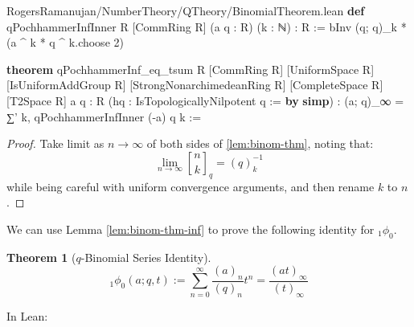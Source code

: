\documentclass[12pt]{amsart}
\newtheorem{theorem}{Theorem}[subsection]
\theoremstyle{definition}
\theoremstyle{remark}
\numberwithin{equation}{subsection}
\newcommand{\qbin}[2]{\genfrac{[}{]}{0pt}{}{#1}{#2}_{q}}
\newcommand{\kw}[1]{\textcolor{keywordcolor}{\textbf{#1}}}
\newcommand{\var}[1]{\textcolor{tacticcolor}{#1}}
\newcommand{\prop}[1]{\textcolor{sortcolor}{#1}}
\newcommand{\num}[1]{\textcolor{numcolor}{#1}}
\newcommand{\imp}[1]{\textcolor{commentcolor}{\textbraceleft#1\textbraceright}}
\begin{document}
\begin{code}{RogersRamanujan/NumberTheory/QTheory/BinomialTheorem.lean}
\kw{def} qPochhammerInfInner \imp{R} [CommRing \var{R}] (\var{a} \var{q} : \var{R}) (\var{k} : ℕ) : \var{R} :=
  bInv (\var{q}; \var{q})_\var{k} * (\var{a} ^ \var{k} * \var{q} ^ \var{k}.\prop{choose} \num{2})

\kw{theorem} qPochhammerInf_eq_tsum \imp{R} [CommRing \var{R}] [UniformSpace \var{R}]
  [IsUniformAddGroup \var{R}] [StrongNonarchimedeanRing \var{R}] [CompleteSpace \var{R}] [T2Space \var{R}]
  \imp{a q : R} (\var{hq} : IsTopologicallyNilpotent \var{q} := \kw{by} \kw{simp}) :
  (\var{a}; \var{q})_∞ = ∑' \var{k}, qPochhammerInfInner (-\var{a}) \var{q} \var{k} :=
\end{code}
\begin{proof}
    Take limit as $n \to \infty$ of both sides of \ref{lem:binom-thm}, noting that:
    \begin{equation}
        \lim_{n \to \infty} \qbin{n}{k} = (q)_k^{-1}
    \end{equation}
    while being careful with uniform convergence arguments, and then rename $k$ to $n$.
\end{proof}

We can use Lemma \ref{lem:binom-thm-inf} to prove the following identity for ${}_{1}\phi_{0}$.
\begin{theorem}[$q$-Binomial Series Identity]
    \label{thm:q-binomial-series}
    \begin{equation}
    \label{eqn:q-binomial-series}
        {}_{1}\phi_{0}(a;q,t) := \sum_{n=0}^{\infty} \frac{(a)_n}{(q)_n} t^n = \frac{(at)_\infty}{(t)_\infty}
    \end{equation}
\end{theorem}

In Lean:
\end{document}

